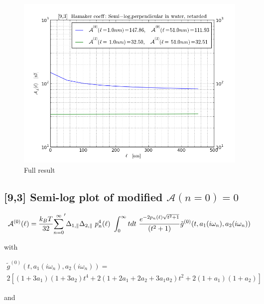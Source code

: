 \documentclass[a4paper]{article}
\begin{document}
\begin{center}
\begin{figure}[t!]
\begin{center}
\includegraphics[width=1.0\textwidth]{plots/140322_93w93_HCs_semilog_perpendicular_ret.png}
\hskip 43pt
\caption{Full result}
\label{eiz65}
\end{center}
\end{figure} 

\subsection{[9,3] Semi-log plot of modified $\mathcal{A}(n=0)=0$}
\begin{equation}
{\cal A}^{(0)}(\ell) = \frac{k_BT}{32}  {\sum_{n=0}^{\infty}}' \Delta_{1,\parallel} \Delta_{2,\parallel} ~p_n^{4}(\ell) ~\int_0^{\infty} t dt ~\frac{e^{- 2 p_n(\ell) \sqrt{t^{2} + 1}}}{(t^{2} + 1)} \tilde g^{(0)}(t, a_1(i \omega_n), a_2(i \omega_n))
\end{equation}

with

\begin{multline*}
\tilde g^{(0)}(t, a_1(i \omega_n), a_2(i \omega_n)) = \\ 
2 \left[ (1+3a_1)(1+3a_2) t^{4} + 2 (1+2a_1+2a_2+3a_1a_2) t^{2}  + 2(1+a_1)(1+a_2)\right]
\end{multline*}

%
and


\end{center}
\end{document}
